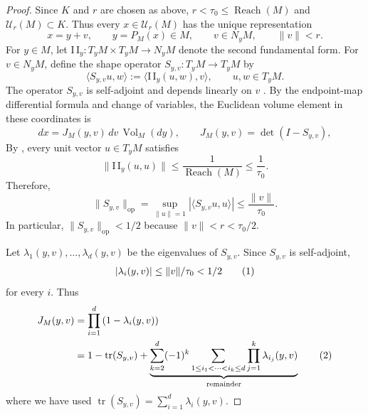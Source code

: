 \documentclass{article}
\newcommand{\Vol}{\operatorname{Vol}}
\newcommand{\Reach}{\operatorname{Reach}}
\numberwithin{equation}{section}
\newcommand{\lp}{\left(}
\newcommand{\rp}{\right)}
\newcommand{\Ucal}{\mathcal{U}}
\newcommand\numberthis{\addtocounter{equation}{1}\tag{\theequation}}
\begin{document}
\begin{proof}
Since $K$ and $r$ are chosen as above, $r<\tau_0\le\Reach(M)$ and
$\Ucal_r(M)\subset K$. Thus every $x\in\Ucal_r(M)$ has the unique representation
\[
  x=y+v,
  \qquad y=P_M(x)\in M,
  \qquad v\in N_yM,
  \qquad \lVert v\rVert<r.
\]
For $y\in M$, let
$\mathrm{I\,I}_y:T_yM\times T_yM\to N_yM$ denote the second fundamental
form. For $v\in N_yM$, define the shape operator
$S_{y,v}:T_yM\to T_yM$ by
\[
 \langle S_{y,v}u,w\rangle
 :=\langle \mathrm{I\,I}_y(u,w),v\rangle,
 \qquad u,w\in T_yM.
\]
The operator $S_{y,v}$ is self-adjoint and depends linearly on $v$ \citep[eq. (8.4)]{lee2018riemannian}. By the endpoint-map differential formula \citep[Proposition~4.1.8]{palais1988} and change of variables, the Euclidean volume element in these
coordinates is
\begin{equation}
 dx=J_M(y,v)\,dv\,\Vol_M(dy),
 \qquad
 J_M(y,v)=\det(I-S_{y,v}),
\label{eq:tube-jacobian}
\end{equation}
By \citet[Proposition~A.1(i)]{aamari2019reach}, every unit vector
$u\in T_yM$ satisfies
\[
 \lVert\mathrm{I\,I}_y(u,u)\rVert
 \le \frac{1}{\Reach(M)}
 \le \frac{1}{\tau_0}.
\]
Therefore,
\[
 \lVert S_{y,v}\rVert_{\mathrm{op}}
 =\sup_{\lVert u\rVert=1}
   |\langle S_{y,v}u,u\rangle|
 \le \frac{\lVert v\rVert}{\tau_0}.
\]
In particular, $\lVert S_{y,v}\rVert_{\mathrm{op}}<1/2$ because
$\lVert v\rVert<r<\tau_0/2$. 

Let $\lambda_1(y,v),\ldots,\lambda_d(y,v)$ be the eigenvalues of
$S_{y,v}$. Since $S_{y,v}$ is self-adjoint,
\begin{align*}
|\lambda_i(y,v)|\le\lVert v\rVert/\tau_0<1/2\numberthis\label{eq:eigenvalue-bound}  
\end{align*}
for every $i$. Thus
\begin{align*}
 J_M(y,v) & = \prod_{i=1}^d \lp 1-\lambda_i(y,v)\rp\\
 & =1-\operatorname{tr}(S_{y,v})
  +\underbrace{\sum_{k=2}^d(-1)^k
    \sum_{1\le i_1<\cdots<i_k\le d}
    \prod_{j=1}^k\lambda_{i_j}(y,v)}_{\text{remainder}}
\label{eq:jacobian-expansion}\numberthis
\end{align*}
where we have used
$\operatorname{tr}(S_{y,v})=\sum_{i=1}^d\lambda_i(y,v)$.


\end{proof}
\end{document}
